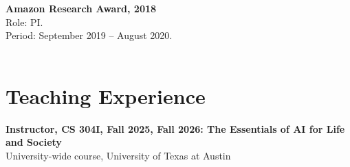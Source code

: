 \documentclass[Times]{article}
\newcommand{\funding}[1]{#1\\}
\renewcommand{\funding}[1]{\\}
\begin{document}
\textbf{Amazon Research Award, 2018}\\
Role: PI.\\
Period: September 2019 -- August 2020.\\
\funding{Amount: \$80,000.}









\par\endgroup
\section*{Teaching Experience}

\setlength{\parskip}{1em}

{\bf Instructor, CS 304I, Fall 2025, Fall 2026: The Essentials of AI for Life and Society}\\
University-wide course, University of Texas at Austin
\end{document}
